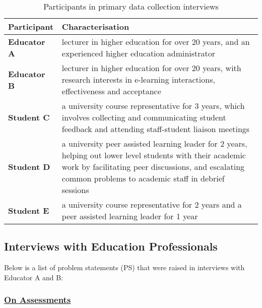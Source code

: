 \begin{table}[!h] 
    \caption{Participants in primary data collection interviews}
    \centering
    \label{table:participants-req}
    \begin{tabularx}{\textwidth}{>{\bfseries}lX}
        Participant & Characterisation\\
        \toprule
        Educator A & lecturer in higher education for over 20 years, and an experienced higher education 
        administrator\\\midrule
        Educator B & lecturer in higher education for over 20 years, with research interests 
        in e-learning interactions, effectiveness and acceptance\\\midrule
        Student C & a university course representative for 3 years, which involves collecting and 
        communicating student feedback and attending staff-student liaison meetings \\\midrule
        Student D & a university peer assisted learning leader for 2 years, helping out lower level 
        students with their academic work by facilitating peer discussions, and escalating common problems
        to academic staff in debrief sessions\\\midrule
        Student E & a university course representative for 2 years and a peer assisted learning leader 
        for 1 year\\\bottomrule
    \end{tabularx}
\end{table}

\subsection{Interviews with Education Professionals}

Below is a list of problem statements (PS) that were raised in interviews with Educator A and B:

\subsubsection{\underline{On Assessments}}

